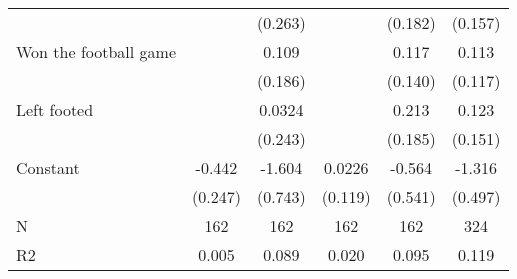 {\begin{tabular}{l*{5}{c}}
                    &                     &     (0.263)         &                     &     (0.182)         &     (0.157)         \\
[1em]
Won the football game&                     &       0.109         &                     &       0.117         &       0.113         \\
                    &                     &     (0.186)         &                     &     (0.140)         &     (0.117)         \\
[1em]
Left footed         &                     &      0.0324         &                     &       0.213         &       0.123         \\
                    &                     &     (0.243)         &                     &     (0.185)         &     (0.151)         \\
[1em]
Constant            &      -0.442\sym{*}  &      -1.604\sym{**} &      0.0226         &      -0.564         &      -1.316\sym{***}\\
                    &     (0.247)         &     (0.743)         &     (0.119)         &     (0.541)         &     (0.497)         \\
\hline
N                   &         162         &         162         &         162         &         162         &         324         \\
R2                  &       0.005         &       0.089         &       0.020         &       0.095         &       0.119         \\
\hline\hline
\end{tabular}
}
